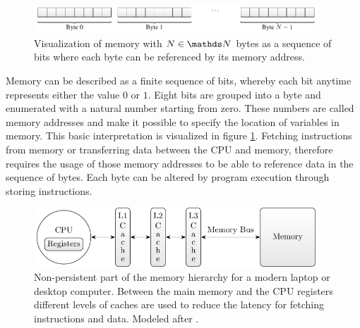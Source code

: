 \documentclass{stdlocal}
\begin{document}
    \begin{figure}[b]
      \center
      \includegraphics[width=0.95\textwidth]{figures/memory.pdf}
      \caption[Memory Structure]{%
        Visualization of memory with $N\in\setNatural$ bytes as a sequence of bits where each byte can be referenced by its memory address.%
      }
      \label{fig:memory}
    \end{figure}

    Memory can be described as a finite sequence of bits, whereby each bit anytime represents either the value $0$ or $1$.
    Eight bits are grouped into a byte and enumerated with a natural number starting from zero.
    These numbers are called memory addresses and make it possible to specify the location of variables in memory.
    This basic interpretation is visualized in figure \ref{fig:memory}.
    Fetching instructions from memory or transferring data between the CPU and memory, therefore requires the usage of those memory addresses to be able to reference data in the sequence of bytes.
    Each byte can be altered by program execution through storing instructions.
    \autocite{patterson2014}

    \begin{figure}
      \center
      \includegraphics[width=0.95\textwidth]{figures/memory_hierarchy.pdf}
      \caption[Memory Hierarchy]{%
        Non-persistent part of the memory hierarchy for a modern laptop or desktop computer.
        Between the main memory and the CPU registers different levels of caches are used to reduce the latency for fetching instructions and data.
        Modeled after \textcite[\pno~79]{hennessy2019}.
      }
      \label{fig:memory-hierarchy}
    \end{figure}
\end{document}

